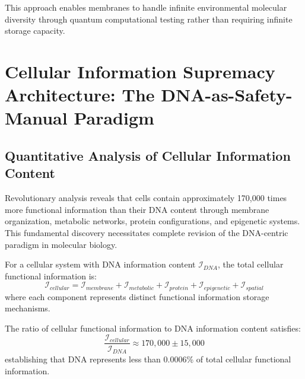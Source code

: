﻿\documentclass[11pt,a4paper]{article}
\begin{document}
This approach enables membranes to handle infinite environmental molecular diversity through quantum computational testing rather than requiring infinite storage capacity.

\section{Cellular Information Supremacy Architecture: The DNA-as-Safety-Manual Paradigm}

\subsection{Quantitative Analysis of Cellular Information Content}

Revolutionary analysis reveals that cells contain approximately 170,000 times more functional information than their DNA content through membrane organization, metabolic networks, protein configurations, and epigenetic systems. This fundamental discovery necessitates complete revision of the DNA-centric paradigm in molecular biology.

\begin{definition}
For a cellular system with DNA information content $\mathcal{I}_{DNA}$, the total cellular functional information is:
\begin{equation}
\mathcal{I}_{cellular} = \mathcal{I}_{membrane} + \mathcal{I}_{metabolic} + \mathcal{I}_{protein} + \mathcal{I}_{epigenetic} + \mathcal{I}_{spatial}
\end{equation}
where each component represents distinct functional information storage mechanisms.
\end{definition}

\begin{theorem}
The ratio of cellular functional information to DNA information content satisfies:
\begin{equation}
\frac{\mathcal{I}_{cellular}}{\mathcal{I}_{DNA}} \approx 170,000 \pm 15,000
\end{equation}
establishing that DNA represents less than 0.0006\% of total cellular functional information.
\end{theorem}
\end{document}
